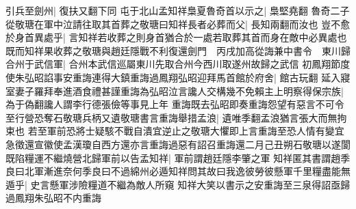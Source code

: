 引兵至劍州|{
	復扶又翻下同}
屯于北山孟知祥梟夏魯奇首以示之|{
	梟堅堯翻}
魯奇二子從敬瑭在軍中泣請往取其首葬之敬瑭曰知祥長者必葬而父|{
	長知兩翻而汝也}
豈不愈於身首異處乎|{
	言知祥若收葬之則身首猶合於一處若取葬其首而身在敵中必異處也}
既而知祥果收葬之敬瑭與趙廷隱戰不利復還劍門　丙戌加高從誨兼中書令　東川歸合州于武信軍|{
	合州本武信巡屬東川先取合州今西川取遂州故歸之武信}
初鳳翔節度使朱弘昭諂事安重誨連得大鎮重誨過鳳翔弘昭迎拜馬首館於府舍|{
	館古玩翻}
延入寢室妻子羅拜奉進酒食禮甚謹重誨為弘昭泣言讒人交構幾不免賴主上明察得保宗族|{
	為于偽翻讒人謂李行德張儉等事見上年}
重誨既去弘昭即奏重誨怨望有惡言不可令至行營恐奪石敬瑭兵柄又遺敬瑭書言重誨舉措孟浪|{
	遺唯季翻孟浪猶言張大而無拘束也}
若至軍前恐將士疑駭不戰自潰宜逆止之敬瑭大懼即上言重誨至恐人情有變宜急徵還宣徽使孟漢瓊自西方還亦言重誨過惡有詔召重誨還二月己丑朔石敬瑭以遂閬既陷糧運不繼燒營北歸軍前以告孟知祥|{
	軍前謂趙廷隱李肇之軍}
知祥匿其書謂趙季良曰北軍漸進奈何季良曰不過綿州必遁知祥問其故曰我逸彼勞彼懸軍千里糧盡能無遁乎|{
	史言懸軍涉險糧道不繼為敵人所窺}
知祥大笑以書示之安重誨至三泉得詔亟歸過鳳翔朱弘昭不内重誨

